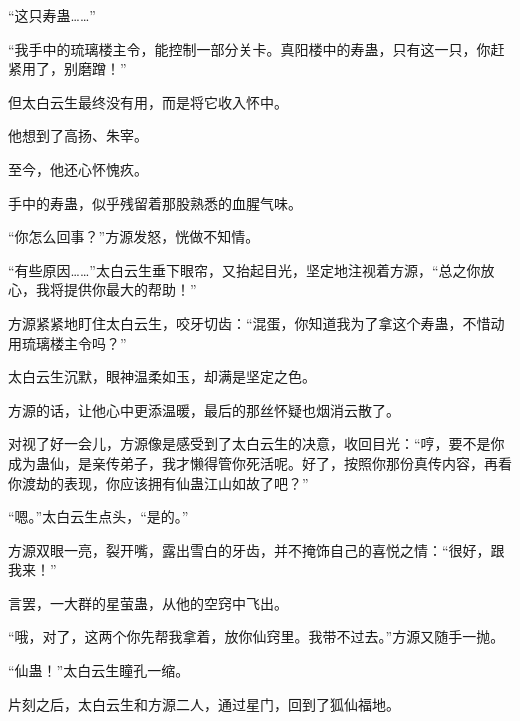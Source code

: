 \begin{this_body}
“这只寿蛊……”

“我手中的琉璃楼主令，能控制一部分关卡。真阳楼中的寿蛊，只有这一只，你赶紧用了，别磨蹭！”

但太白云生最终没有用，而是将它收入怀中。

他想到了高扬、朱宰。

至今，他还心怀愧疚。

手中的寿蛊，似乎残留着那股熟悉的血腥气味。

“你怎么回事？”方源发怒，恍做不知情。

“有些原因……”太白云生垂下眼帘，又抬起目光，坚定地注视着方源，“总之你放心，我将提供你最大的帮助！”

方源紧紧地盯住太白云生，咬牙切齿：“混蛋，你知道我为了拿这个寿蛊，不惜动用琉璃楼主令吗？”

太白云生沉默，眼神温柔如玉，却满是坚定之色。

方源的话，让他心中更添温暖，最后的那丝怀疑也烟消云散了。

对视了好一会儿，方源像是感受到了太白云生的决意，收回目光：“哼，要不是你成为蛊仙，是亲传弟子，我才懒得管你死活呢。好了，按照你那份真传内容，再看你渡劫的表现，你应该拥有仙蛊江山如故了吧？”

“嗯。”太白云生点头，“是的。”

方源双眼一亮，裂开嘴，露出雪白的牙齿，并不掩饰自己的喜悦之情：“很好，跟我来！”

言罢，一大群的星萤蛊，从他的空窍中飞出。

“哦，对了，这两个你先帮我拿着，放你仙窍里。我带不过去。”方源又随手一抛。

“仙蛊！”太白云生瞳孔一缩。

片刻之后，太白云生和方源二人，通过星门，回到了狐仙福地。

\end{this_body}

